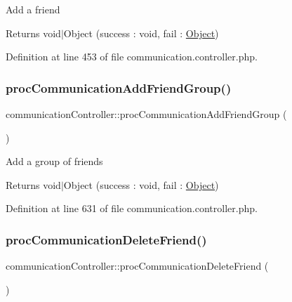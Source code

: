 Add a friend \begin{DoxyReturn}{Returns}
void$\vert$\+Object (success \+: void, fail \+: \hyperlink{classObject}{Object}) 
\end{DoxyReturn}


Definition at line 453 of file communication.\+controller.\+php.

\mbox{\label{classcommunicationController_a903d152bacec7414ebd368daaae1ff8f}} 
\subsubsection{\texorpdfstring{proc\+Communication\+Add\+Friend\+Group()}{procCommunicationAddFriendGroup()}}
{\footnotesize\ttfamily communication\+Controller\+::proc\+Communication\+Add\+Friend\+Group (\begin{DoxyParamCaption}{ }\end{DoxyParamCaption})}

Add a group of friends \begin{DoxyReturn}{Returns}
void$\vert$\+Object (success \+: void, fail \+: \hyperlink{classObject}{Object}) 
\end{DoxyReturn}


Definition at line 631 of file communication.\+controller.\+php.

\mbox{\label{classcommunicationController_a841c965fa92d8086b4d26fe2a0492f38}} 
\subsubsection{\texorpdfstring{proc\+Communication\+Delete\+Friend()}{procCommunicationDeleteFriend()}}
{\footnotesize\ttfamily communication\+Controller\+::proc\+Communication\+Delete\+Friend (\begin{DoxyParamCaption}{ }\end{DoxyParamCaption})}

